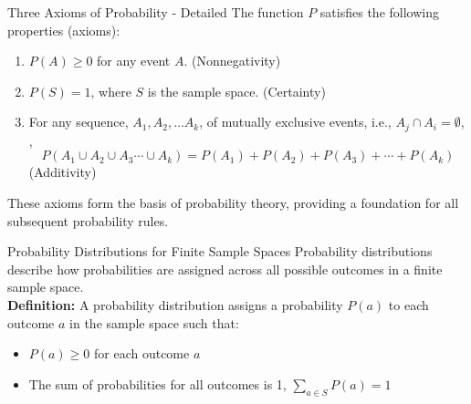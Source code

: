 \documentclass[handout]{beamer} %
\begin{document}
\begin{frame}{Three Axioms of Probability - Detailed}
    The function \(P\) satisfies the following properties (axioms):\pause
    \begin{enumerate}
        \item \(P(A) \geq 0\) for any event \(A\). (Nonnegativity)\pause
        \item \(P(S) = 1\), where \(S\) is the sample space. (Certainty)\pause
        \item For any sequence, \(A_1, A_2, \ldots A_k\), of mutually exclusive events, i.e., $A_j \cap A_i =\emptyset$, , \[P\left(A_1 \cup A_2 \cup A_3 \cdots \cup A_k \right) = P(A_1)+P(A_2)+P(A_3) + \cdots + P(A_k)\] (Additivity)\pause
    \end{enumerate}
    \vspace{2em}
    These axioms form the basis of probability theory, providing a foundation for all subsequent probability rules.
\end{frame}

\begin{frame}{Probability Distributions for Finite Sample Spaces}
    Probability distributions describe how probabilities are assigned across all possible outcomes in a finite sample space. \\ \pause
\vspace{2em}
    \textbf{Definition:}
    A probability distribution assigns a probability \( P(a) \) to each outcome \( a \) in the sample space such that:\pause
    \begin{itemize}
        \item \( P(a) \geq 0 \) for each outcome \( a \)\pause
        \item The sum of probabilities for all outcomes is 1, \( \sum_{a \in S} P(a) = 1 \) \pause {} 
    \end{itemize}

\end{frame}
\end{document}
